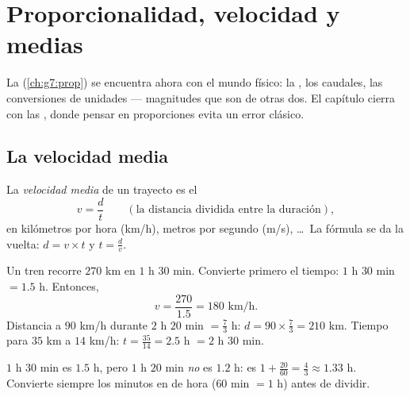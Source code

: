 \chapter{Proporcionalidad, velocidad y medias}\label{ch:g8:speed}

La  (\cref{ch:g7:prop}) se encuentra ahora con el mundo físico:
la , los caudales, las conversiones de unidades --- magnitudes que son
\emph{} de otras dos. El capítulo cierra con las , donde pensar en proporciones evita un error clásico.

\section{La velocidad media}

\begin{definition}\label{def:g8:speed:def}
La \emph{velocidad media} de un trayecto es el 
\[
v = \frac{d}{t}
\qquad
\left(\text{la distancia dividida entre la duración}\right),
\]
en kilómetros por hora (km/h), metros por segundo (m/s), \dots\ La
fórmula se da la vuelta: $d = v \times t$ y $t = \frac{d}{v}$.
\end{definition}

\begin{example}\label{ex:g8:speed:basic}
Un tren recorre $270$ km en $1$ h $30$ min. Convierte primero el tiempo:
$1$ h $30$ min $= 1.5$ h. Entonces,
\[
v = \frac{270}{1.5} = 180 \text{ km/h}.
\]
Distancia a $90$ km/h durante $2$ h $20$ min $= \frac73$ h:
$d = 90 \times \frac73 = 210$ km. Tiempo para $35$ km a $14$ km/h:
$t = \frac{35}{14} = 2.5$ h $= 2$ h $30$ min.
\end{example}

\begin{remark}
$1$ h $30$ min es $1.5$ h, pero $1$ h $20$ min \emph{no} es $1.2$ h:
es $1 + \frac{20}{60} = \frac43 \approx 1.33$ h. Convierte siempre los
minutos en  de hora ($60$ min $= 1$ h) antes de dividir.
\end{remark}

